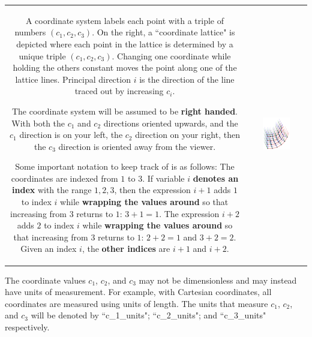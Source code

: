 \documentclass{book}
\begin{document}
\begin{tabular}{cc}
\parbox{0.5\textwidth}{
A coordinate system labels each point with a triple of numbers \((c_1, c_2, c_3)\). On the right, a ``coordinate lattice" is depicted where each point in the lattice is determined by a unique triple \((c_1, c_2, c_3)\). Changing one coordinate while holding the others constant moves the point along one of the lattice lines. Principal direction \(i\) is the direction of the line traced out by increasing \(c_i\).

The coordinate system will be assumed to be {\bf right handed}. With both the \(c_1\) and \(c_2\) directions oriented upwards, and the \(c_1\) direction is on your left, the \(c_2\) direction on your right, then the \(c_3\) direction is oriented away from the viewer.

Some important notation to keep track of is as follows: The coordinates are indexed from \(1\) to \(3\). If variable \(i\) {\bf denotes an index} with the range \(1, 2, 3\), then the expression \(i + 1\) adds \(1\) to index \(i\) while {\bf wrapping the values around} so that increasing from \(3\) returns to \(1\): \(3 + 1 = 1\). The expression \(i + 2\) adds \(2\) to index \(i\) while {\bf wrapping the values around} so that increasing from \(3\) returns to \(1\): \(2 + 2 = 1\) and \(3 + 2 = 2\). Given an index \(i\), the {\bf other indices} are \(i+1\) and \(i+2\).
} & \parbox{0.5\textwidth}{
\includegraphics[width = 0.5\textwidth]{Coordinate_systems/coordinate_system_lattice}
}
\end{tabular}

\vspace{1mm}

The coordinate values \(c_1\), \(c_2\), and \(c_3\) may not be dimensionless and may instead have units of measurement. For example, with Cartesian coordinates, all coordinates are measured using units of length. The units that measure \(c_1\), \(c_2\), and \(c_3\) will be denoted by ``c\_1\_units"; ``c\_2\_units"; and ``c\_3\_units" respectively. 
\end{document}
